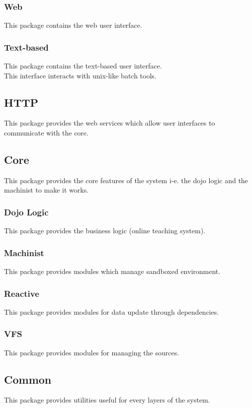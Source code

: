 		\subsubsection{Web}
			This package contains the web user interface.
		\subsubsection{Text-based}
			This package contains the text-based user interface.\\
			This interface interacts with unix-like batch tools.
	\subsection{HTTP}
		This package provides the web services which allow user interfaces to communicate with the core.
	\subsection{Core}
		This package provides the core features of the system i-e. the dojo logic and the machinist to make it works.
		\subsubsection{Dojo Logic}
			This package provides the business logic (online teaching system).
		\subsubsection{Machinist}
			This package provides modules which manage sandboxed environment.
		\subsubsection{Reactive}
			This package provides modules for data update through dependencies.
		\subsubsection{VFS}
			This package provides modules for managing the sources.
	\subsection{Common}
		This package provides utilities useful for every layers of the system.
